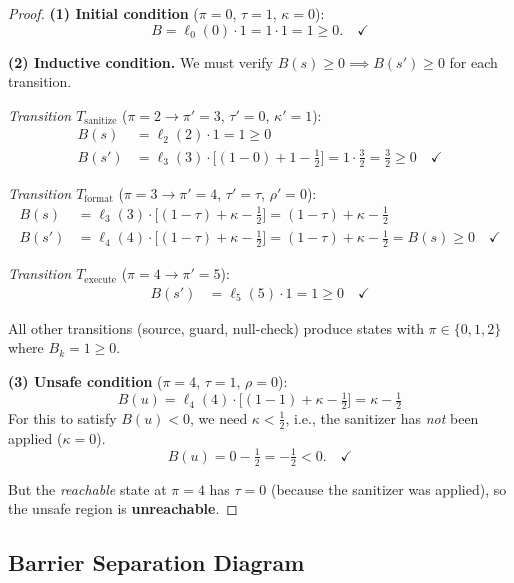 \documentclass[11pt,a4paper]{article}
\theoremstyle{plain}
\theoremstyle{definition}
\theoremstyle{remark}
\begin{document}
\begin{proof}
\medskip
\noindent\textbf{(1) Initial condition} ($\pi=0$, $\tau=1$, $\kappa=0$):
\[
  B = \ell_0(0) \cdot 1 = 1 \cdot 1 = 1 \geq 0. \quad\checkmark
\]

\medskip
\noindent\textbf{(2) Inductive condition.}
We must verify $B(s) \geq 0 \implies B(s') \geq 0$ for each transition.

\smallskip
\emph{Transition $T_{\text{sanitize}}$} ($\pi=2 \to \pi'=3$,
$\tau' = 0$, $\kappa' = 1$):
\begin{align}
  B(s) &= \ell_2(2) \cdot 1 = 1 \geq 0 \\
  B(s') &= \ell_3(3) \cdot \bigl[(1-0) + 1 - \tfrac{1}{2}\bigr]
    = 1 \cdot \tfrac{3}{2} = \tfrac{3}{2} \geq 0 \quad\checkmark
\end{align}

\emph{Transition $T_{\text{format}}$} ($\pi=3 \to \pi'=4$,
$\tau' = \tau$, $\rho' = 0$):
\begin{align}
  B(s) &= \ell_3(3) \cdot \bigl[(1-\tau) + \kappa - \tfrac{1}{2}\bigr]
    = (1-\tau) + \kappa - \tfrac{1}{2} \\
  B(s') &= \ell_4(4) \cdot \bigl[(1-\tau) + \kappa - \tfrac{1}{2}\bigr]
    = (1-\tau) + \kappa - \tfrac{1}{2} = B(s) \geq 0 \quad\checkmark
\end{align}

\emph{Transition $T_{\text{execute}}$} ($\pi=4 \to \pi'=5$):
\begin{align}
  B(s') &= \ell_5(5) \cdot 1 = 1 \geq 0 \quad\checkmark
\end{align}

All other transitions (source, guard, null-check) produce states with
$\pi \in \{0,1,2\}$ where $B_k = 1 \geq 0$.

\medskip
\noindent\textbf{(3) Unsafe condition} ($\pi = 4$, $\tau = 1$,
$\rho = 0$):
\[
  B(u) = \ell_4(4) \cdot \bigl[(1-1) + \kappa - \tfrac{1}{2}\bigr]
    = \kappa - \tfrac{1}{2}
\]
For this to satisfy $B(u) < 0$, we need $\kappa < \tfrac{1}{2}$, i.e.,
the sanitizer has \emph{not} been applied ($\kappa = 0$).
\[
  B(u) = 0 - \tfrac{1}{2} = -\tfrac{1}{2} < 0. \quad\checkmark
\]

But the \emph{reachable} state at $\pi=4$ has $\tau=0$ (because the
sanitizer was applied), so the unsafe region is \textbf{unreachable}.
\end{proof}

\subsection{Barrier Separation Diagram}
\end{document}
